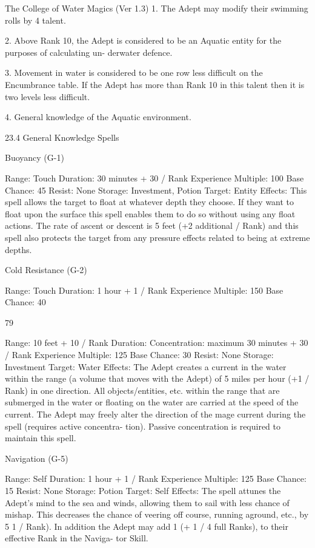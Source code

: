\begin{Chapter}{The College of Water Magics (Ver 1.3)}
1. The Adept may modify their swimming rolls by 
4%
talent. 

2. Above Rank 10, the Adept is considered to be an 
Aquatic  entity  for  the  purposes  of  calculating  un-
derwater defence. 

3. Movement in water is considered to be one row 
less  difficult  on  the  Encumbrance  table.  If  the 
Adept has more than Rank 10 in this talent then it 
is two levels less difficult. 

4. General knowledge of the Aquatic environment. 

23.4 General Knowledge Spells 

Buoyancy (G-1) 

Range: Touch 
Duration: 30 minutes + 30 / Rank 
Experience Multiple: 100 
Base Chance: 45%
Resist: None 
Storage: Investment, Potion 
Target: Entity 
Effects:  This  spell  allows  the  target  to  float  at 
whatever  depth  they  choose.  If  they  want  to  float 
upon  the  surface  this  spell  enables  them  to  do  so 
without  using  any  float  actions.  The rate  of  ascent 
or descent is 5 feet (+2 additional / Rank) and this 
spell  also  protects  the  target  from  any  pressure 
effects related to being at extreme depths. 

Cold Resistance (G-2) 

Range: Touch 
Duration: 1 hour + 1 / Rank 
Experience Multiple: 150 
Base Chance: 40%

79 

Range: 10 feet + 10 / Rank 
Duration:  Concentration:  maximum  30  minutes  + 
30 / Rank 
Experience Multiple: 125 
Base Chance: 30%
Resist: None 
Storage: Investment 
Target: Water 
Effects:  The  Adept  creates  a  current  in  the  water 
within  the  range  (a  volume  that  moves  with  the 
Adept)  of  5  miles  per  hour  (+1  /  Rank)  in  one 
direction. All objects/entities, etc. within the range 
that  are  submerged  in  the  water  or  floating  on  the 
water  are  carried  at  the  speed  of  the  current.  The 
Adept  may  freely  alter  the  direction  of  the  mage 
current during the spell (requires active concentra-
tion). Passive concentration is required to maintain 
this spell. 

Navigation (G-5) 

Range: Self 
Duration: 1 hour + 1 / Rank 
Experience Multiple: 125 
Base Chance: 15%
Resist: None 
Storage: Potion 
Target: Self 
Effects:  The  spell  attunes  the  Adept’s  mind  to  the 
sea  and  winds,  allowing  them  to  sail  with  less 
chance  of  mishap.  This  decreases  the  chance  of 
veering off course, running aground, etc., by 5%
1 / Rank). In addition the Adept may add 1 (+ 1 / 4 
full  Ranks),  to their  effective  Rank  in  the  Naviga-
tor Skill. 


\end{Chapter}
